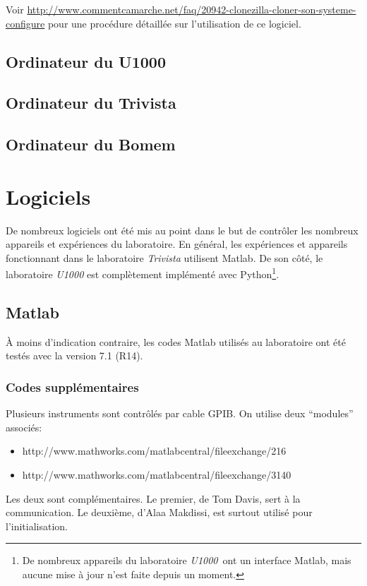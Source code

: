 \documentclass[11pt,francais]{book} %
\begin{document}
Voir \url{http://www.commentcamarche.net/faq/20942-clonezilla-cloner-son-systeme-configure} pour une procédure détaillée sur l'utilisation de ce logiciel.



\section{Ordinateur du U1000}
\section{Ordinateur du Trivista}
\section{Ordinateur du Bomem}


\chapter{Logiciels}

De nombreux logiciels ont été mis au point dans le but de contrôler les nombreux appareils et expériences du laboratoire.
En général, les expériences et appareils fonctionnant dans le laboratoire {\it Trivista} utilisent Matlab.
De son côté, le laboratoire {\it U1000} est complètement implémenté avec Python\footnote{De nombreux appareils du laboratoire {\it U1000}~ont un interface Matlab, mais aucune mise à jour n'est faite depuis un moment.}.

\section{Matlab}%

À moins d'indication contraire, les codes Matlab utilisés au laboratoire ont été testés avec la version 7.1 (R14).

\subsection{Codes supplémentaires}

Plusieurs instruments sont contrôlés par cable GPIB.
On utilise deux ``modules'' associés:
\begin{itemize}
\item http://www.mathworks.com/matlabcentral/fileexchange/216
\item http://www.mathworks.com/matlabcentral/fileexchange/3140
\label{tableModulesGPIBMatlab}
\end{itemize}
Les deux sont complémentaires.
Le premier, de Tom Davis, sert à la communication.
Le deuxième, d'Alaa Makdissi, est surtout utilisé pour l'initialisation.
\end{document}
